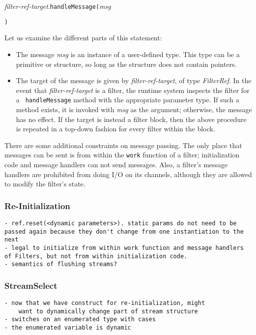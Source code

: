 \documentclass[draft]{article}
\begin{document}
{\it filter-ref-target}.{\tt handleMessage(}{\it msg}{\tt ) %

Let us examine the different parts of this statement:

\begin{itemize}

\item The message {\it msg} is an instance of a user-defined type.
This type can be a primitive or structure, so long as the structure
does not contain pointers.

\item The target of the message is given by {\it filter-ref-target},
of type {\it FilterRef}.  In the event that {\it filter-ref-target} is
a filter, the runtime system inspects the filter for a {\tt
handleMessage} method with the appropriate parameter type.  If such a
method exists, it is invoked with {\it msg} as the argument;
otherwise, the message has no effect.  If the target is instead a
filter block, then the above procedure is repeated in a top-down
fashion for every filter within the block.

\end{itemize}

There are some additional constraints on message passing.  The only
place that messages can be sent is from within the {\tt work} function
of a filter; initialization code and message handlers can not send
messages.  Also, a filter's message handlers are prohibited from doing
I/O on its channels, although they are allowed to modify the filter's
state.

\subsubsection{Re-Initialization}

\begin{verbatim}
- ref.reset(<dynamic parameters>). static params do not need to be
passed again because they don't change from one instantiation to the
next
- legal to initialize from within work function and message handlers
of Filters, but not from within initialization code.
- semantics of flushing streams?
\end{verbatim}

\subsubsection{StreamSelect}

\begin{verbatim}
- now that we have construct for re-initialization, might
	want to dynamically change part of stream structure
- switches on an enumerated type with cases
- the enumerated variable is dynamic
\end{verbatim}

}
\end{document}
